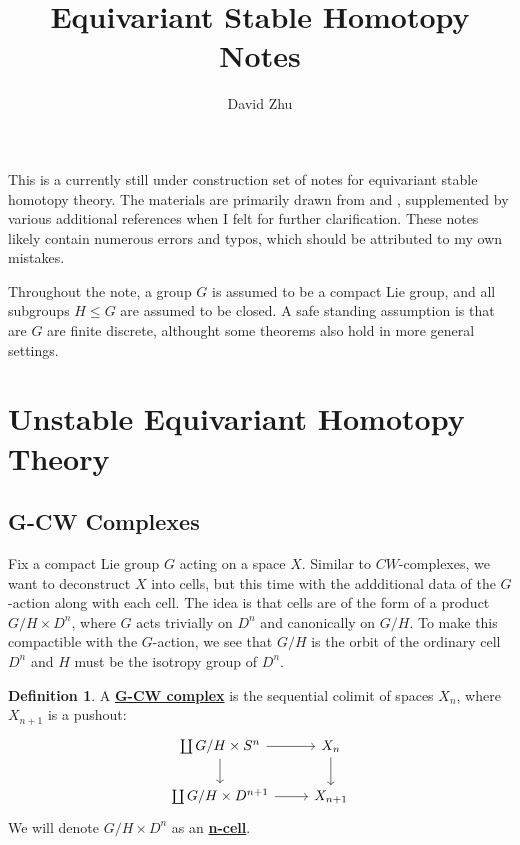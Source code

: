 \documentclass{article}
\title{Equivariant Stable Homotopy Notes}
\author{David Zhu}
\theoremstyle{definition}
\newtheorem{definition}[theorem]{Definition}
\begin{document}
\maketitle
This is a currently still under construction set of notes for equivariant stable homotopy theory. The materials are primarily drawn from \cite{Blumberg} and \cite{SS}, supplemented by various additional references when I felt for further clarification. These notes likely contain numerous errors and typos, which should be attributed to my own mistakes. 

Throughout the note, a group $G$ is assumed to be a compact Lie group, and all subgroups $H\leq G$ are assumed to be closed. A safe standing assumption is that are $G$ are finite discrete, althought some theorems also hold in more general settings. 

\tableofcontents

\newpage

\section{Unstable Equivariant Homotopy Theory}
\subsection{G-CW Complexes}
Fix a compact Lie group $G$ acting on a space $X$. Similar to $CW$-complexes, we want to deconstruct $X$ into cells, but this time with the addditional data of the $G$-action along with each cell. The idea is that cells are of the form of a product $G/H\times D^{n}$, where $G$ acts trivially on $D^n$ and canonically on $G/H$. To make this compactible with the $G$-action, we see that $G/H$ is the orbit of the ordinary cell $D^n$ and $H$ must be the isotropy group of $D^n$. 


\begin{tcolorbox}[colback=purple!5!white,colframe=purple!75!black]
\begin{definition}
\label{G-CW}
A \underline{\textbf{G-CW complex}} is the sequential colimit of spaces $X_n$, where $X_{n+1}$ is a pushout: 
\[\begin{tikzcd}
\coprod G/H\times S^n\arrow[r]\arrow[d]&X_n\arrow[d]\\
\coprod G/H\times D^{n+1}\arrow[r]&X_{n+1}
\end{tikzcd}\]
We will denote  $G/H\times D^{n}$ as an \underline{\textbf{n-cell}}. 
\end{definition}
\end{tcolorbox}
\end{document}
